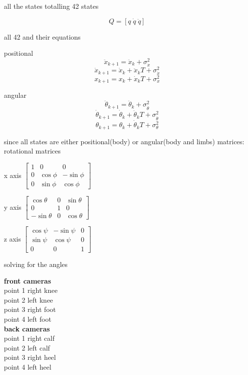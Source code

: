 all the states totalling 42 states

$$	Q =	 [q \; \dot{q} \; \ddot{q}] $$

all 42 and their equations

positional
$$ \ddot{x}_{k+1} = \ddot{x}_{k} + \sigma_{\ddot{x}}^{2} $$
$$ \dot{x}_{k+1} = \dot{x}_{k} + \ddot{x}_{k}T + \sigma_{\dot{x}}^{2} $$
$$ x_{k+1} = x_{k} + \dot{x}_{k}T + \sigma_{x}^{2} $$

angular
$$ \ddot{\theta}_{k+1} = \ddot{\theta}_{k} + \sigma_{\ddot{\theta}}^{2} $$
$$ \dot{\theta}_{k+1} = \dot{\theta}_{k} + \ddot{\theta}_{k}T + \sigma_{\dot{\theta}}^{2} $$
$$ \theta_{k+1} = \theta_{k} + \dot{\theta}_{k}T + \sigma_{\theta}^{2} $$

since all states are either positional(body) or angular(body and limbs)
matrices:
rotational matrices


\begin{center}
x axis
$\begin{bmatrix} 
1 & 0 & 0 \\ 
0 & \cos{\phi} & -\sin{\phi} \\ 
0 & \sin{\phi} & \cos{\phi}  
\end{bmatrix}$

y axis
$\begin{bmatrix} 
\cos{\theta} & 0 & \sin{\theta} \\ 
0 & 1 & 0 \\ 
-\sin{\theta} & 0 & \cos{\theta}  
\end{bmatrix}$

z axis
$\begin{bmatrix} 
\cos{\psi} & -\sin{\psi} & 0 \\ 
\sin{\psi} & \cos{\psi} & 0 \\ 
0 & 0 & 1  
\end{bmatrix}$
\end{center}

solving for the angles


\textbf{front cameras}\\
point 1 right knee\\
point 2 left knee\\
point 3 right foot\\
point 4 left foot\\

\textbf{back cameras}\\
point 1 right calf\\
point 2 left calf\\
point 3 right heel\\
point 4 left heel\\

